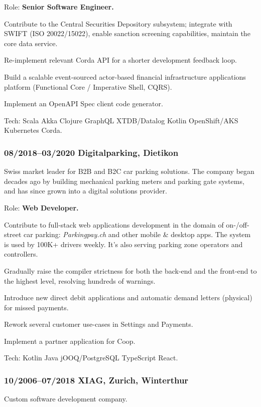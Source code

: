 \documentclass[a4paper, twocolumn, 10pt]{article}
\begin{document}
Role: \textbf{Senior Software Engineer.}

Contribute to the Central Securities Depository subsystem; integrate with SWIFT (ISO 20022/15022),
enable sanction screening capabilities, maintain the core data service.

Re-implement relevant Corda API for a shorter development feedback loop.

Build a scalable event-sourced actor-based financial infrastructure applications platform (Functional Core /
Imperative Shell, CQRS).

Implement an OpenAPI Spec client code generator.

Tech: Scala Akka Clojure GraphQL XTDB/Datalog Kotlin OpenShift/AKS Kubernetes Corda.

\subsubsection*{08/2018--03/2020 Digitalparking, Dietikon}

Swiss market leader for B2B and B2C car parking solutions. The company began decades ago by building
mechanical parking meters and parking gate systems, and has since grown into a digital solutions
provider.

Role: \textbf{Web Developer.}

Contribute to full-stack web applications development in the domain of on-/off-street car parking:
\emph{Parkingpay.ch} and other mobile \& desktop apps. The system is used by 100K+ drivers
weekly. It's also serving parking zone operators and controllers.

Gradually raise the compiler strictness for both the back-end and the front-end to the highest
level, resolving hundreds of warnings.

Introduce new direct debit applications and automatic demand letters (physical) for missed payments.

Rework several customer use-cases in Settings and Payments.

Implement a partner application for Coop.

Tech: Kotlin Java jOOQ/PostgreSQL TypeScript React.

\subsubsection*{10/2006--07/2018 XIAG, Zurich, Winterthur}

Custom software development company.
\end{document}
